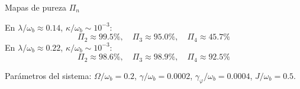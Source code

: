 \documentclass[
11pt,notheorems,hyperref={pdfauthor=whatever}
]{beamer}
\begin{document}
\begin{frame}{Mapas de pureza $\Pi_n$}
	
	\vspace{-8pt}
	
	\begin{center}
		\resizebox{0.65\textwidth}{!}{%
		}
	\end{center}
	
	{\small
		En $\lambda/\omega_b \approx 0.14$, $\kappa/\omega_b \sim 10^{-3}$:
		\begin{equation*}
			\Pi_2 \approx 99.5\%,\quad
			\Pi_3 \approx 95.0\%,\quad
			\Pi_4 \approx 45.7\%
		\end{equation*}
		En $\lambda/\omega_b \approx 0.22$, $\kappa/\omega_b \sim 10^{-3}$:
		\begin{equation*}
			\Pi_2 \approx 98.6\%,\quad
			\Pi_3 \approx 98.9\%,\quad
			\Pi_4 \approx 92.5\%
		\end{equation*}
	}
	
	\vspace{10pt}
	{\scriptsize
		Parámetros del sistema: $\Omega/\omega_b=0.2$, $\gamma/\omega_b=0.0002$,
		$\gamma_\varphi/\omega_b=0.0004$, $J/\omega_b=0.5$.
	}
	
\end{frame}
\end{document}
